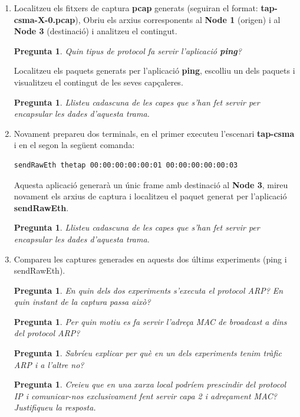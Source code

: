\documentclass[12pt,a4paper]{article}
\newcounter{exercises}
\newtheorem{exer}[exercises]{Pregunta}
\begin{document}
\begin{enumerate}
\item Localitzeu els fitxers de captura \textbf{pcap} generats (seguiran el format: \textbf{tap-csma-X-0.pcap}),
Obriu els arxius corresponents al \textbf{Node 1} (origen) i al \textbf{Node 3}
(destinació) i analitzeu el contingut.

\begin{exer} Quin tipus de protocol fa servir l'aplicació \textbf{ping}? \end{exer}

Localitzeu els paquets generats per l'aplicació \textbf{ping}, escolliu un dels paquets i visualitzeu el contingut de les seves capçaleres.

\begin{exer} Llisteu cadascuna de les capes que s'han fet servir per encapsular les dades d'aquesta trama. \end{exer}

\item Novament prepareu dos terminals, en el primer executeu l'escenari \textbf{tap-csma} i en el segon la següent comanda:
\begin{lstlisting}[language=bash]
sendRawEth thetap 00:00:00:00:00:01 00:00:00:00:00:03
\end{lstlisting}

Aquesta aplicació generarà un únic frame amb destinació al \textbf{Node 3}, mireu novament els arxius de captura i localitzeu
el paquet generat per l'aplicació \textbf{sendRawEth}.

\begin{exer} Llisteu cadascuna de les capes que s'han fet servir per encapsular les dades d'aquesta trama. \end{exer}

\item Compareu les captures generades en aquests dos últims experiments (ping i sendRawEth).

\begin{exer} En quin dels dos experiments s'executa el protocol ARP? En quin instant de la captura passa això? \end{exer}
\begin{exer} Per quin motiu es fa servir l'adreça MAC de broadcast a dins del protocol ARP? \end{exer}
\begin{exer} Sabríeu explicar per què en un dels experiments tenim tràfic ARP i a l'altre no? \end{exer}
\begin{exer} Creieu que en una xarxa local podríem prescindir del protocol IP i comunicar-nos exclusivament fent servir capa 2 i adreçament MAC? Justifiqueu la resposta. \end{exer}
\end{enumerate}
\end{document}

